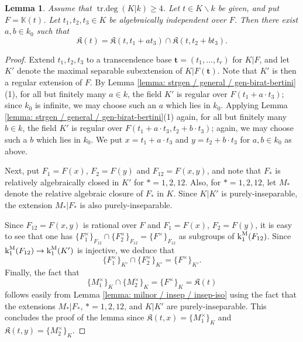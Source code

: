 \documentclass[11pt]{amsart}
\newtheorem{lemma}[proposition]{Lemma}
\theoremstyle{definition}
\theoremstyle{remark}
\numberwithin{equation}{section}
\DeclareMathOperator{\trdeg}{tr.deg}
\newcommand{\Kbb}{\mathbb{K}}
\newcommand{\tbf}{\mathbf{t}}
\newcommand{\Kfrak}{\mathfrak{K}}
\renewcommand{\k}{\operatorname{k}^{\rm M}}
\begin{document}
\begin{lemma}
\label{lemma: mainproof / intersections / gen-intersections}
  Assume that $\trdeg(K|k) \geq 4$.
  Let $t \in K \smallsetminus k$ be given, and put $F = \Kbb(t)$.
  Let $t_1,t_2,t_3 \in K$ be algebraically independent over $F$.
  Then there exist $a,b \in k_0$ such that
  \[ \Kfrak(t) = \Kfrak(t,t_1+a t_3) \cap \Kfrak(t,t_2+b t_3). \]
\end{lemma}
\begin{proof}
  Extend $t_1,t_2,t_3$ to a transcendence base $\tbf = (t_1,\ldots,t_r)$ for $K|F$, and let $K'$ denote the maximal separable subextension of $K|F(\tbf)$.
  Note that $K'$ is then a regular extension of $F$.
  By Lemma \ref{lemma: strgen / general / gen-birat-bertini}(1), for all but finitely many $a \in k$, the field $K'$ is regular over $F(t_1+a \cdot t_3)$; since $k_0$ is infinite, we may choose such an $a$ which lies in $k_0$.
  Applying Lemma \ref{lemma: strgen / general / gen-birat-bertini}(1) again, for all but finitely many $b \in k$, the field $K'$ is regular over $F(t_1 + a \cdot t_3,t_2 + b \cdot t_3)$; again, we may choose such a $b$ which lies in $k_0$.
  We put $x = t_1 + a \cdot t_3$ and $y = t_2 + b \cdot t_3$ for $a,b \in k_0$ as above.

  Next, put $F_1 = F(x)$, $F_2 = F(y)$ and $F_{12} = F(x,y)$, and note that $F_*$ is relatively algebraically closed in $K'$ for $* = 1,2,12$.
  Also, for $* = 1,2,12$, let $M_*$ denote the relative algebraic closure of $F_*$ in $K$.
  Since $K|K'$ is purely-inseparable, the extension $M_*|F_*$ is also purely-inseparable.

  Since $F_{12} = F(x,y)$ is rational over $F$ and $F_1 = F(x)$, $F_2 = F(y)$, it is easy to see that one has $\{F_1^\times\}_{F_{12}} \cap \{F_2^\times\}_{F_{12}} = \{F^\times\}_{F_{12}}$ as subgroups of $\k_1(F_{12})$.
  Since $\k_1(F_{12}) \rightarrow \k_1(K')$ is injective, we deduce that
  \[ \{F_1^\times\}_{K'} \cap \{F_2^\times\}_{K'} = \{F^\times\}_{K'}. \]
  Finally, the fact that 
  \[ \{M_1^\times\}_K \cap \{M_2^\times\}_K = \{F^\times\}_K = \Kfrak(t) \]
  follows easily from Lemma \ref{lemma: milnor / insep / insep-iso} using the fact that the extensions $M_*|F_*$, $* = 1,2,12$, and $K|K'$ are purely-inseparable.
  This concludes the proof of the lemma since $\Kfrak(t,x) = \{M_1^\times\}_K$ and $\Kfrak(t,y) = \{M_2^\times\}_K$.
\end{proof}
\end{document}
